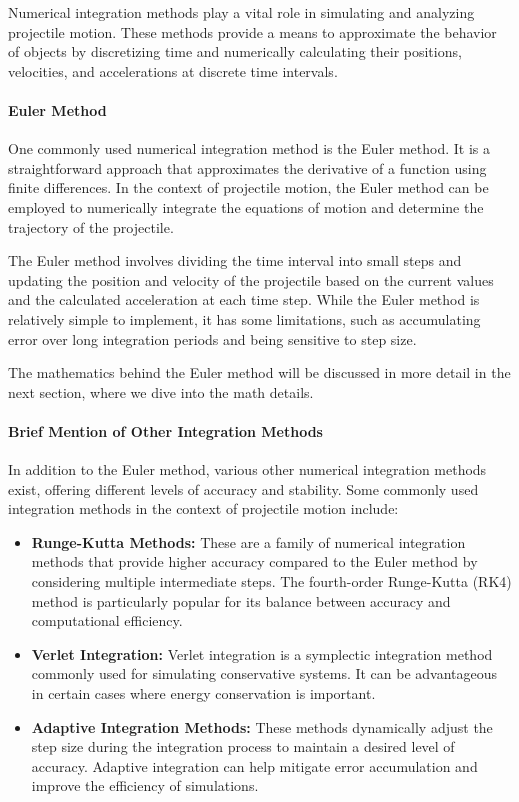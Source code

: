 \documentclass[11pt]{article}
\begin{document}
Numerical integration methods play a vital role in simulating and
analyzing projectile motion. These methods provide a means to
approximate the behavior of objects by discretizing time and numerically
calculating their positions, velocities, and accelerations at discrete
time intervals.

\hypertarget{euler-method}{%
\paragraph{Euler Method}\label{euler-method}}

One commonly used numerical integration method is the Euler method. It
is a straightforward approach that approximates the derivative of a
function using finite differences. In the context of projectile motion,
the Euler method can be employed to numerically integrate the equations
of motion and determine the trajectory of the projectile.

The Euler method involves dividing the time interval into small steps
and updating the position and velocity of the projectile based on the
current values and the calculated acceleration at each time step. While
the Euler method is relatively simple to implement, it has some
limitations, such as accumulating error over long integration periods
and being sensitive to step size.

The mathematics behind the Euler method will be discussed in more detail
in the next section, where we dive into the math details.

\hypertarget{brief-mention-of-other-integration-methods}{%
\paragraph{Brief Mention of Other Integration
Methods}\label{brief-mention-of-other-integration-methods}}

In addition to the Euler method, various other numerical integration
methods exist, offering different levels of accuracy and stability. Some
commonly used integration methods in the context of projectile motion
include:

\begin{itemize}
\item
  \textbf{Runge-Kutta Methods:} These are a family of numerical
  integration methods that provide higher accuracy compared to the Euler
  method by considering multiple intermediate steps. The fourth-order
  Runge-Kutta (RK4) method is particularly popular for its balance
  between accuracy and computational efficiency.
\item
  \textbf{Verlet Integration:} Verlet integration is a symplectic
  integration method commonly used for simulating conservative systems.
  It can be advantageous in certain cases where energy conservation is
  important.
\item
  \textbf{Adaptive Integration Methods:} These methods dynamically
  adjust the step size during the integration process to maintain a
  desired level of accuracy. Adaptive integration can help mitigate
  error accumulation and improve the efficiency of simulations.
\end{itemize}
\end{document}
